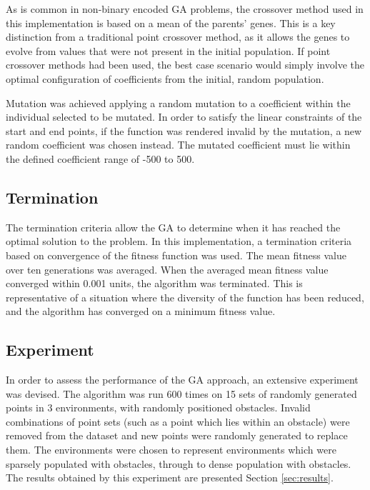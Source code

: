 As is common in non-binary encoded GA problems, the crossover method used in this implementation is based on a mean of the parents' genes. This is a key distinction from a traditional point crossover method, as it allows the genes to evolve from values that were not present in the initial population. If point crossover methods had been used, the best case scenario would simply involve the optimal configuration of coefficients from the initial, random population.

Mutation was achieved applying a random mutation to a coefficient within the individual selected to be mutated. In order to satisfy the linear constraints of the start and end points, if the function was rendered invalid by the mutation, a new random coefficient was chosen instead. The mutated coefficient must lie within the defined coefficient range of -500 to 500.

\subsection{Termination}
The termination criteria allow the GA to determine when it has reached the optimal solution to the problem. In this implementation, a termination criteria based on convergence of the fitness function was used. The mean fitness value over ten generations was averaged. When the averaged mean fitness value converged within 0.001 units, the algorithm was terminated. This is representative of a situation where the diversity of the function has been reduced, and the algorithm has converged on a minimum fitness value.

\subsection{Experiment} \label{sec:experiment}
In order to assess the performance of the GA approach, an extensive experiment was devised. The algorithm was run 600 times on 15 sets of randomly generated points in 3 environments, with randomly positioned obstacles. Invalid combinations of point sets (such as a point which lies within an obstacle) were removed from the dataset and new points were randomly generated to replace them. The environments were chosen to represent environments which were sparsely populated with obstacles, through to dense population with obstacles. The results obtained by this experiment are presented Section \ref{sec:results}.

